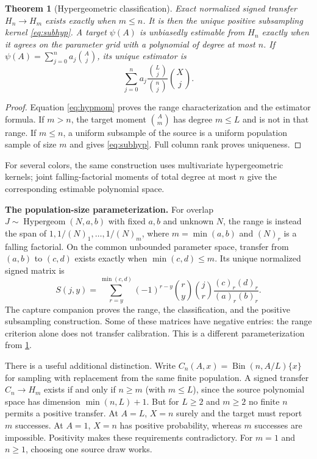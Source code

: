 \documentclass[11pt]{article}
\numberwithin{equation}{section}
\newtheorem{theorem}{Theorem}[section]
\theoremstyle{definition}
\theoremstyle{remark}
\newcommand{\Bin}{\operatorname{Bin}}\newcommand{\Hyp}{\operatorname{Hyp}}\newcommand{\osc}{\operatorname{osc}}\newcommand{\col}{\operatorname{col}}
\begin{document}
\begin{theorem}[Hypergeometric classification]\label{thm:hyper}
Exact normalized signed transfer $H_n\to H_m$ exists exactly when $m\le n$. It is then the unique positive subsampling kernel \eqref{eq:subhyp}. A target $\psi(A)$ is unbiasedly estimable from $H_n$ exactly when it agrees on the parameter grid with a polynomial of degree at most $n$. If $\psi(A)=\sum_{j=0}^na_j\binom Aj$, its unique estimator is
\[
 \sum_{j=0}^na_j\frac{\binom Lj}{\binom nj}\binom Xj.
\]
\end{theorem}
\begin{proof}
Equation \eqref{eq:hypmom} proves the range characterization and the estimator formula. If $m>n$, the target moment $\binom Am$ has degree $m\le L$ and is not in that range. If $m\le n$, a uniform subsample of the source is a uniform population sample of size $m$ and gives \eqref{eq:subhyp}. Full column rank proves uniqueness.
\end{proof}
For several colors, the same construction uses multivariate hypergeometric kernels; joint falling-factorial moments of total degree at most $n$ give the corresponding estimable polynomial space.

\par\medskip\noindent\textbf{The population-size parameterization.}
For overlap $J\sim\operatorname{Hypergeom}(N,a,b)$ with fixed $a,b$ and
unknown $N$, the range is instead the span of $1,1/(N)_1,\ldots,1/(N)_m$,
where $m=\min(a,b)$ and $(N)_r$ is a falling factorial. On the common
unbounded parameter space, transfer from $(a,b)$ to $(c,d)$ exists exactly
when $\min(c,d)\le m$. Its unique normalized signed matrix is
\[
 S(j,y)=\sum_{r=y}^{\min(c,d)}(-1)^{r-y}\binom ry\binom jr
 \frac{(c)_r(d)_r}{(a)_r(b)_r}.
\]
The capture companion \cite{LongCapture} proves the range, the classification,
and the positive subsampling construction. Some of these matrices have
negative entries: the range criterion alone does not transfer calibration.
This is a different parameterization from \cref{thm:hyper}.
\par\medskip


There is a useful additional distinction. Write $C_n(A,x)=\Bin(n,A/L)\{x\}$ for sampling with replacement from the same finite population. A signed transfer $C_n\to H_m$ exists if and only if $n\ge m$ (with $m\le L$), since the source polynomial space has dimension $\min(n,L)+1$. But for $L\ge2$ and $m\ge2$ no finite $n$ permits a positive transfer. At $A=L$, $X=n$ surely and the target must report $m$ successes. At $A=1$, $X=n$ has positive probability, whereas $m$ successes are impossible. Positivity makes these requirements contradictory. For $m=1$ and $n\ge1$, choosing one source draw works.
\end{document}
